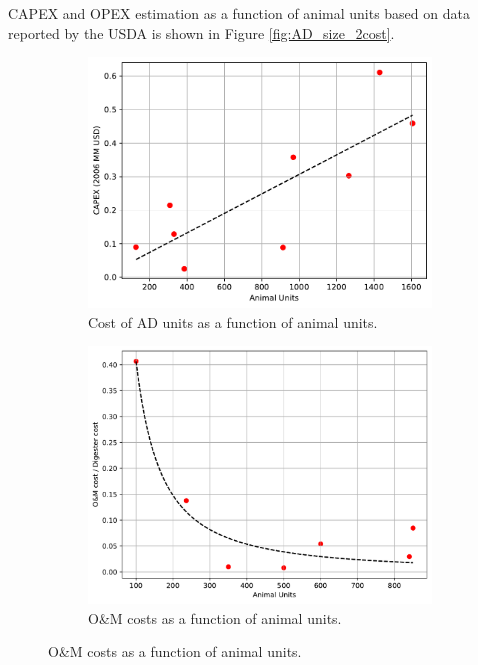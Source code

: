 \begin{refsection}[referencesApD]
CAPEX and OPEX estimation as a function of animal units based on data reported by the USDA \citep{USDA_OM} is shown in Figure \ref{fig:AD_size_2cost}.
\begin{figure}[h!]
	\centering
	\begin{subfigure}[t]{0.48\textwidth}
		\includegraphics[width=\textwidth, trim={0cm 0cm 0cm 0cm},clip]{gfx/AppendixD/AD_SizeCost_Swine.pdf}
		\caption{Cost of AD units as a function of animal units.}
		\label{fig:AD_SizeCost_Swine}
	\end{subfigure}
	\quad
	\begin{subfigure}[t]{0.47\textwidth}
		\includegraphics[width=\textwidth]{gfx/AppendixD/AD_size_OM_Unit_cost.pdf} 
		\caption{O\&M costs as a function of animal units.}
		\label{fig:AD_size_OM_Unit_cost}
	\end{subfigure}
	

\end{figure}
\end{refsection}
